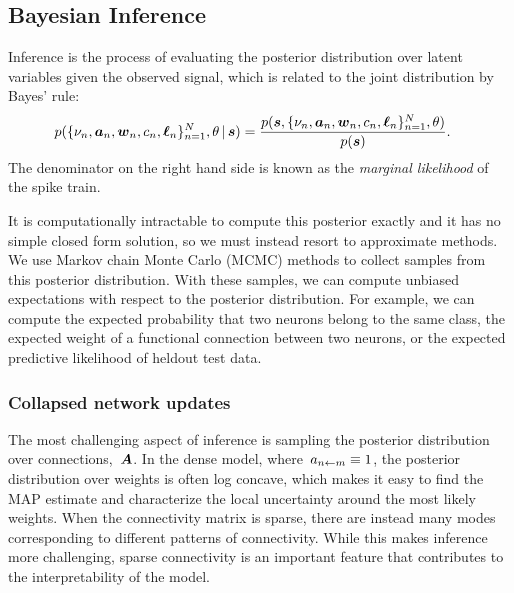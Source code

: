 \subsection{Bayesian Inference}
Inference is the process of evaluating the posterior distribution over latent variables given the observed signal, which is related to the joint distribution by Bayes' rule:
\begin{align}
p(\{\nu_n, \boldsymbol{a}_n, \boldsymbol{w}_n, c_n, \boldsymbol{\ell}_n\}_{n=1}^N, \theta \,|\, \boldsymbol{s})  
  &= \frac{p(\boldsymbol{s}, \{\nu_n, \boldsymbol{a}_n, \boldsymbol{w}_n, c_n, \boldsymbol{\ell}_n\}_{n=1}^N, \theta) }{p(\boldsymbol{s})}.
\end{align}
The denominator on the right hand side is known as the \emph{marginal likelihood} of the spike train. 

It is computationally intractable to compute this posterior exactly and it has no simple closed form solution, so we must instead resort to approximate methods. 
We use Markov chain Monte Carlo (MCMC) methods to collect samples from this posterior distribution.
With these samples, we can compute unbiased expectations with respect to the posterior distribution.
For example, we can compute the expected probability that two neurons belong to the same class, the expected weight of a functional connection between two neurons, or the expected predictive likelihood of heldout test data.


\subsubsection{Collapsed network updates}
The most challenging aspect of inference is sampling the
posterior distribution over connections,~$\boldsymbol{A}$. In the
dense model, where~$a_{n \leftarrow m} \equiv 1$, the posterior
distribution over weights is often log concave, which
makes it easy to find the MAP estimate and characterize
the local uncertainty around the most likely weights.
When the connectivity matrix is sparse, there are instead
many modes corresponding to different patterns of
connectivity. While this makes inference more challenging,
sparse connectivity is an important feature that
contributes to the interpretability of the model.

